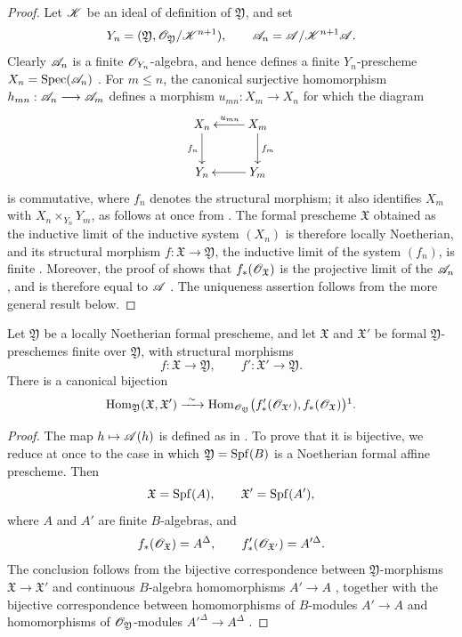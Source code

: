 \begin{proof}
Let $\mathscr{K}$ be an ideal of definition of $\mathfrak{Y}$, and set
\[
  Y_n=(\mathfrak{Y},
       \mathscr{O}_{\mathfrak{Y}}/\mathscr{K}^{n+1}),
  \qquad
  \mathscr{A}_n=\mathscr{A}/\mathscr{K}^{n+1}\mathscr{A}.
\]
Clearly $\mathscr{A}_n$ is a finite $\mathscr{O}_{Y_n}$-algebra, and hence
defines a finite $Y_n$-prescheme $X_n=\operatorname{Spec}(\mathscr{A}_n)$
.  For $m\leq n$, the canonical surjective
homomorphism $h_{mn}:\mathscr{A}_n\longrightarrow\mathscr{A}_m$
defines a morphism $u_{mn}:X_m\to X_n$ for which the diagram
\[
  \xymatrix{
    X_n\ar[d]_{f_n} &
    X_m\ar[l]_{u_{mn}}\ar[d]^{f_m}\\
    Y_n &
    Y_m\ar[l]
  }
\]
is commutative, where $f_n$ denotes the structural morphism; it
also identifies $X_m$ with
$X_n\times_{Y_n}Y_m$, as follows at once from
.  The formal prescheme $\mathfrak{X}$ obtained
as the inductive limit of the inductive system $(X_n)$ is therefore
locally Noetherian, and its structural morphism $f:\mathfrak{X}\longrightarrow\mathfrak{Y}$,
the inductive limit of the system $(f_n)$, is finite
 .  Moreover, the proof of
 shows that
$f_*(\mathscr{O}_{\mathfrak{X}})$ is the projective limit of the
$\mathscr{A}_n$, and is therefore equal to $\mathscr{A}$
.  The uniqueness assertion follows from the
more general result below.
\end{proof}

\begin{proposition}[4.8.8]
\label{III.4.8.8}
Let $\mathfrak{Y}$ be a locally Noetherian formal prescheme, and
let $\mathfrak{X}$ and $\mathfrak{X}'$ be formal
$\mathfrak{Y}$-preschemes finite over $\mathfrak{Y}$, with
structural morphisms
\[
  f:\mathfrak{X}\to\mathfrak{Y},\qquad
  f':\mathfrak{X}'\to\mathfrak{Y}.
\]
There is a canonical bijection
\[
  \Hom_{\mathfrak{Y}}(\mathfrak{X},\mathfrak{X}')
  \xrightarrow{\ \sim\ }
  \Hom_{\sh{O}_{\mathfrak{Y}}}
  \bigl(f'_*(\sh{O}_{\mathfrak{X}'}),
        f_*(\sh{O}_{\mathfrak{X}})\bigr)\footnotemark.
\]
\end{proposition}

\begin{proof}
The map $h\mapsto\mathscr{A}(h)$ is defined as in
.  To prove that it is bijective, we reduce at
once to the case in which
$\mathfrak{Y}=\operatorname{Spf}(B)$ is a Noetherian formal affine prescheme.
Then
\[
  \mathfrak{X}=\operatorname{Spf}(A),\qquad
  \mathfrak{X}'=\operatorname{Spf}(A'),
\]
where $A$ and $A'$ are finite $B$-algebras, and
\[
  f_*(\mathscr{O}_{\mathfrak{X}})=A^\Delta,\qquad
  f'_*(\mathscr{O}_{\mathfrak{X}'})=A'^\Delta.
\]
The conclusion follows from the bijective correspondence between
$\mathfrak{Y}$-morphisms
$\mathfrak{X}\to\mathfrak{X}'$ and continuous $B$-algebra
homomorphisms $A'\to A$ , together with the
bijective correspondence between homomorphisms of $B$-modules
$A'\to A$ and homomorphisms of
$\mathscr{O}_{\mathfrak{Y}}$-modules
$A'^\Delta\to A^\Delta$ .
\end{proof}

